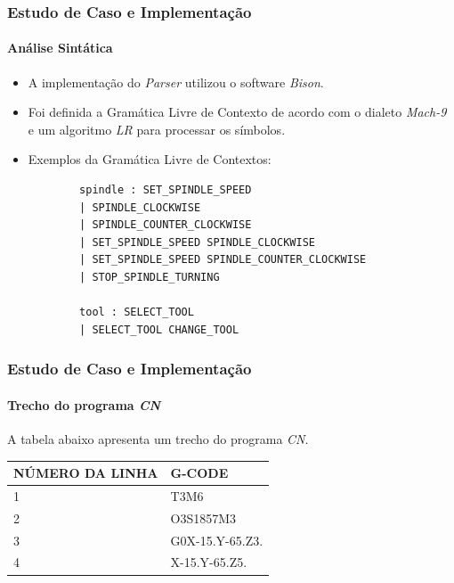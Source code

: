 \documentclass[aspectratio=169]{beamer}
\begin{document}
{\begin{frame}
\end{frame}


\begin{frame}[fragile]
  \frametitle{Estudo de Caso e Implementação}
  \framesubtitle{Análise Sintática}
  \begin{itemize}
    \item A implementação do \emph{Parser} utilizou o software 
          \emph{Bison}.
    \item Foi definida a Gramática Livre de Contexto de acordo com o 
          dialeto \emph{Mach-9} e um algoritmo \emph{LR}
          para processar os símbolos.
    \item Exemplos da Gramática Livre de Contextos:
      \begin{lstlisting}
        spindle : SET_SPINDLE_SPEED
        | SPINDLE_CLOCKWISE
        | SPINDLE_COUNTER_CLOCKWISE
        | SET_SPINDLE_SPEED SPINDLE_CLOCKWISE
        | SET_SPINDLE_SPEED SPINDLE_COUNTER_CLOCKWISE
        | STOP_SPINDLE_TURNING
      
        tool : SELECT_TOOL
        | SELECT_TOOL CHANGE_TOOL    
    \end{lstlisting}
  \end{itemize}

\end{frame}  


\begin{frame}[fragile]
  \frametitle{Estudo de Caso e Implementação}
  \framesubtitle{Trecho do programa \emph{CN}}

  A tabela abaixo apresenta um trecho do programa \emph{CN}.

  \vspace{3mm}

  \begin{tabular}{l|l}
    \hline
    \scriptsize{\bfseries{NÚMERO DA LINHA}} & 
    \scriptsize{\bfseries{G-CODE}} \\
    \hline

    \scriptsize{1} & \scriptsize{T3M6} \\    
    \hline

    \scriptsize{2} & \scriptsize{O3S1857M3} \\
    \hline

    \scriptsize{3} & \scriptsize{G0X-15.Y-65.Z3.} \\
    \hline
      
    \scriptsize{4} & \scriptsize{X-15.Y-65.Z5.} \\
    \hline


\end{tabular}
\end{frame}}
\end{document}
